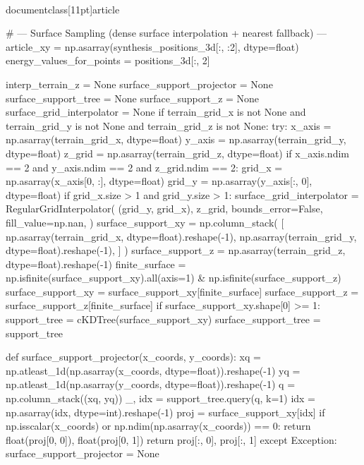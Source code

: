 \\documentclass[11pt]{article}
\begin{document}
\begin{CodeBlock}
{{{{{    # --- Surface Sampling (dense surface interpolation + nearest fallback) ---
    article_xy = np.asarray(synthesis_positions_3d[:, :2], dtype=float)
    energy_values_for_points = positions_3d[:, 2]

    interp_terrain_z = None
    surface_support_projector = None
    surface_support_tree = None
    surface_support_z = None
    surface_grid_interpolator = None
    if terrain_grid_x is not None and terrain_grid_y is not None and terrain_grid_z is not None:
        try:
            x_axis = np.asarray(terrain_grid_x, dtype=float)
            y_axis = np.asarray(terrain_grid_y, dtype=float)
            z_grid = np.asarray(terrain_grid_z, dtype=float)
            if x_axis.ndim == 2 and y_axis.ndim == 2 and z_grid.ndim == 2:
                grid_x = np.asarray(x_axis[0, :], dtype=float)
                grid_y = np.asarray(y_axis[:, 0], dtype=float)
                if grid_x.size > 1 and grid_y.size > 1:
                    surface_grid_interpolator = RegularGridInterpolator(
                        (grid_y, grid_x),
                        z_grid,
                        bounds_error=False,
                        fill_value=np.nan,
                    )
            surface_support_xy = np.column_stack(
                [
                    np.asarray(terrain_grid_x, dtype=float).reshape(-1),
                    np.asarray(terrain_grid_y, dtype=float).reshape(-1),
                ]
            )
            surface_support_z = np.asarray(terrain_grid_z, dtype=float).reshape(-1)
            finite_surface = np.isfinite(surface_support_xy).all(axis=1) & np.isfinite(surface_support_z)
            surface_support_xy = surface_support_xy[finite_surface]
            surface_support_z = surface_support_z[finite_surface]
            if surface_support_xy.shape[0] >= 1:
                support_tree = cKDTree(surface_support_xy)
                surface_support_tree = support_tree

                def surface_support_projector(x_coords, y_coords):
                    xq = np.atleast_1d(np.asarray(x_coords, dtype=float)).reshape(-1)
                    yq = np.atleast_1d(np.asarray(y_coords, dtype=float)).reshape(-1)
                    q = np.column_stack((xq, yq))
                    _, idx = support_tree.query(q, k=1)
                    idx = np.asarray(idx, dtype=int).reshape(-1)
                    proj = surface_support_xy[idx]
                    if np.isscalar(x_coords) or np.ndim(np.asarray(x_coords)) == 0:
                        return float(proj[0, 0]), float(proj[0, 1])
                    return proj[:, 0], proj[:, 1]
        except Exception:
            surface_support_projector = None

}}}}}
\end{CodeBlock}
\end{document}

